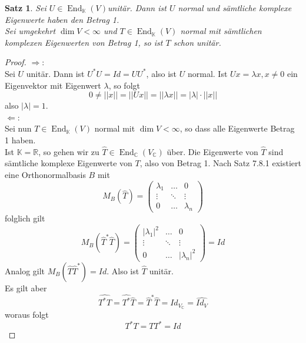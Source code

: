 \documentclass[12pt,a4paper]{article}
\newtheorem{theorem}{Satz}
\theoremstyle{definition}
\theoremstyle{remark}
\renewcommand{\hat}[1]{\widehat{#1}}
\DeclareMathOperator{\End}{End}
\begin{document}
	\begin{theorem}
			Sei $U \in \End_{\mathbb{K}}(V)$unitär. Dann ist $U$ normal und sämtliche komplexe Eigenwerte haben den Betrag 1.\\
			Sei umgekehrt $\dim V<\infty$ und $T \in \End_{\mathbb{K}}(V)$ normal mit sämtlichen komplexen Eigenwerten von Betrag 1, so ist $T$ schon unitär.			
	\end{theorem}
	\begin{proof}
		$\Rightarrow$: \\
		Sei $U$ unitär. Dann ist $U^*U=Id=UU^*$, also ist $U$ normal. Ist $Ux=\lambda x, x \neq 0$ ein Eigenvektor mit Eigenwert $\lambda$, so folgt
		\begin{equation}
			0 \neq ||x||=||Ux||=||\lambda x||=|\lambda|\cdot ||x||
		\end{equation}
		also $|\lambda|=1$. \\
		$\Leftarrow$: \\
		Sei nun $T \in \End_{\mathbb{K}}(V)$ normal mit $\dim V < \infty$, so dass alle Eigenwerte Betrag 1 haben. \\
		Ist $\mathbb{K=\mathbb{R}}$, so gehen wir zu $\hat{T} \in \End_{\mathbb{C}}(V_{\mathbb{C}})$ über. Die Eigenwerte von $\hat{T}$ sind sämtliche komplexe Eigenwerte von $T$, also von Betrag 1. Nach Satz 7.8.1 existiert eine Orthonormalbasis $B$ mit
		\begin{equation}
			M_B(\hat{T})=\begin{pmatrix}
				\lambda_1 & \dots & 0 \\
				\vdots & \ddots & \vdots \\
				0 & \dots & \lambda_n
			\end{pmatrix}
		\end{equation}
		folglich gilt
		\begin{equation}
			M_B(\hat{T}^*\hat{T})= \begin{pmatrix}
				|\lambda_1|^2 & \dots & 0 \\
				\vdots & \ddots & \vdots \\
				0 & \dots & |\lambda_n|^2
			\end{pmatrix} = Id
		\end{equation}
		Analog gilt $M_B(\hat{T}\hat{T}^*)=Id$.
		Also ist $\hat{T}$ unitär. \\		
		Es gilt aber
		\begin{equation}
			\hat{T^*T}= \hat{T^*}\hat{T}=\hat{T}^* \hat{T}=Id_{V_{\mathbb{C}}}=\hat{Id_V}
		\end{equation}
		woraus folgt
		\begin{equation}
			T^*T=TT^*=Id
		\end{equation}
	\end{proof}
\end{document}
